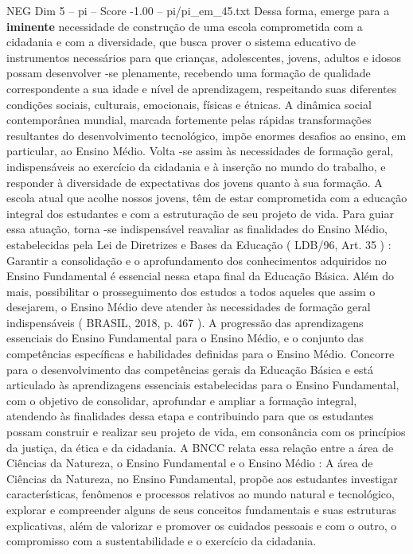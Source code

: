 \begin{textsample}{NEG Dim 5 – pi – Score -1.00 – pi/pi\_em\_45.txt}
Dessa forma, emerge para a \textbf{iminente} necessidade de construção de uma escola comprometida com a cidadania e com a diversidade, que busca prover o sistema educativo de instrumentos necessários para que crianças, adolescentes, jovens, adultos e idosos possam desenvolver -se plenamente, recebendo uma formação de qualidade correspondente a sua idade e nível de aprendizagem, respeitando suas diferentes condições sociais, culturais, emocionais, físicas e étnicas.
A dinâmica social contemporânea mundial, marcada fortemente pelas rápidas transformações resultantes do desenvolvimento tecnológico, impõe enormes desafios ao ensino, em particular, ao Ensino Médio.
Volta -se assim às necessidades de formação geral, indispensáveis ao exercício da cidadania e à inserção no mundo do trabalho, e responder à diversidade de expectativas dos jovens quanto à sua formação.
A escola atual que acolhe nossos jovens, têm de estar comprometida com a educação integral dos estudantes e com a estruturação de seu projeto de vida.
Para guiar essa atuação, torna -se indispensável reavaliar as finalidades do Ensino Médio, estabelecidas pela Lei de Diretrizes e Bases da Educação ( LDB/96, Art. 35 ) : Garantir a consolidação e o aprofundamento dos conhecimentos adquiridos no Ensino Fundamental é essencial nessa etapa final da Educação Básica.
Além do mais, possibilitar o prosseguimento dos estudos a todos aqueles que assim o desejarem, o Ensino Médio deve atender às necessidades de formação geral indispensáveis ( BRASIL, 2018, p. 467 ).
A progressão das aprendizagens essenciais do Ensino Fundamental para o Ensino Médio, e o conjunto das competências específicas e habilidades definidas para o Ensino Médio.
Concorre para o desenvolvimento das competências gerais da Educação Básica e está articulado às aprendizagens essenciais estabelecidas para o Ensino Fundamental, com o objetivo de consolidar, aprofundar e ampliar a formação integral, atendendo às finalidades dessa etapa e contribuindo para que os estudantes possam construir e realizar seu projeto de vida, em consonância com os princípios da justiça, da ética e da cidadania.
A BNCC relata essa relação entre a área de Ciências da Natureza, o Ensino Fundamental e o Ensino Médio : A área de Ciências da Natureza, no Ensino Fundamental, propõe aos estudantes investigar características, fenômenos e processos relativos ao mundo natural e tecnológico, explorar e compreender alguns de seus conceitos fundamentais e suas estruturas explicativas, além de valorizar e promover os cuidados pessoais e com o outro, o compromisso com a sustentabilidade e o exercício da cidadania.

\end{textsample}
